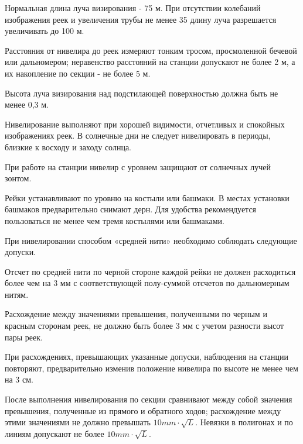 \documentclass[a4paper]{article}
\begin{document}
\begin{newpage}
{        \par Нормальная длина луча визирования - 75 м. При отсутствии колебаний изображения реек и увеличения трубы не менее 35 длину луча разрешается увеличивать до 100 м.
        \par Расстояния от нивелира до реек измеряют тонким тросом, просмоленной бечевой или дальномером; неравенство расстояний на станции допускают не более 2 м, а их накопление по секции - не более 5 м.
        \par Высота луча визирования над подстилающей поверхностью должна быть не менее 0,3 м.
        \par Нивелирование выполняют при хорошей видимости, отчетливых и спокойных изображениях реек. В солнечные дни не следует нивелировать в периоды, близкие к восходу и заходу солнца.
        \par При работе на станции нивелир с уровнем защищают от солнечных лучей зонтом.
        \par Рейки устанавливают по уровню на костыли или башмаки. В местах установки башмаков предварительно снимают дерн. Для удобства рекомендуется пользоваться не менее чем тремя костылями или башмаками.
        \par При нивелировании способом «средней нити» необходимо соблюдать следующие допуски.
        \par Отсчет по средней нити по черной стороне каждой рейки не должен расходиться более чем на 3 мм с соответствующей полу-суммой отсчетов по дальномерным нитям.
        \par Расхождение между значениями превышения, полученными по черным и красным сторонам реек, не должно быть более 3 мм с учетом разности высот пары реек.
        \par При расхождениях, превышающих указанные допуски, наблюдения на станции повторяют, предварительно изменив положение нивелира по высоте не менее чем на 3 см.
        \par После выполнения нивелирования по секции сравнивают между собой значения превышения, полученные из прямого и обратного ходов; расхождение между этими значениями не должно превышать $10 mm \cdot \sqrt L$. Невязки в полигонах и по линиям допускают не более $10 mm \cdot \sqrt L$.
    }
    
\end{newpage}
\end{document}
